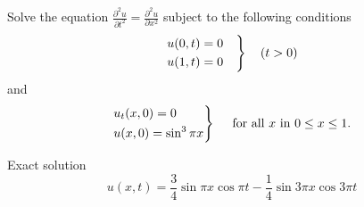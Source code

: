 \documentclass[../main-sheet.tex]{subfiles}
\begin{document}
\begin{ex}
    Solve the equation \(\frac{\partial^2 u}{\partial t^2}=\frac{\partial^2 u}{\partial x^2}\) subject to the following conditions
    \[
        \begin{rcases}
            \displaystyle u(0,t)=0\quad\\
            \displaystyle u(1,t)=0    
        \end{rcases}\quad (t>0)
    \]
    and
    \[
        \begin{rcases}
            \displaystyle u_t(x,0)=0\quad\\
            \displaystyle u(x,0)=\sin^3 \pi x    
        \end{rcases}\quad \text{ for all }x \text{ in } 0\leq x\leq 1.
    \]
\end{ex}
\begin{note}
    Exact solution
    \[u(x,t)=\frac{3}{4}\sin \pi x\cos \pi t-\frac{1}{4}\sin 3\pi x\cos 3\pi t\]
\end{note}
\end{document}
